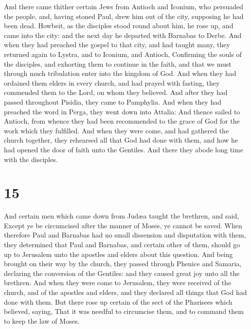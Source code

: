  And there came thither certain Jews from Antioch and
Iconium, who persuaded the people, and, having stoned Paul, drew him out
of the city, supposing he had been dead.  Howbeit, as the
disciples stood round about him, he rose up, and came into the city: and
the next day he departed with Barnabas to Derbe.  And when
they had preached the gospel to that city, and had taught many, they
returned again to Lystra, and to Iconium, and Antioch, 
Confirming the souls of the disciples, and exhorting them to continue in
the faith, and that we must through much tribulation enter into the
kingdom of God.  And when they had ordained them elders in
every church, and had prayed with fasting, they commended them to the
Lord, on whom they believed.  And after they had passed
throughout Pisidia, they came to Pamphylia.  And when they
had preached the word in Perga, they went down into Attalia:
 And thence sailed to Antioch, from whence they had been
recommended to the grace of God for the work which they fulfilled.
 And when they were come, and had gathered the church
together, they rehearsed all that God had done with them, and how he had
opened the door of faith unto the Gentiles.  And there they
abode long time with the disciples.

\hypertarget{section-14}{%
\section{15}\label{section-14}}

 And certain men which came down from Judæa taught the
brethren, and said, Except ye be circumcised after the manner of Moses,
ye cannot be saved.  When therefore Paul and Barnabas had no
small dissension and disputation with them, they determined that Paul
and Barnabas, and certain other of them, should go up to Jerusalem unto
the apostles and elders about this question.  And being
brought on their way by the church, they passed through Phenice and
Samaria, declaring the conversion of the Gentiles: and they caused great
joy unto all the brethren.  And when they were come to
Jerusalem, they were received of the church, and of the apostles and
elders, and they declared all things that God had done with them.
 But there rose up certain of the sect of the Pharisees
which believed, saying, That it was needful to circumcise them, and to
command them to keep the law of Moses.


